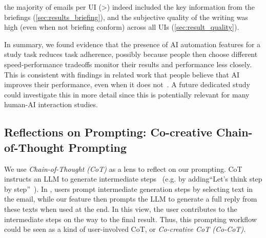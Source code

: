  the majority of emails per UI (>) indeed included the key information from the briefings (\cref{sec:results_briefing}), and the subjective quality of the writing was high (even when not briefing conform) across all UIs (\cref{sec:result_quality}).

In summary, we found evidence that the presence of AI automation features for a study task reduces task adherence, possibly because people then choose different speed-performance tradeoffs  monitor their results and performance less closely. This is consistent with findings in related work that people believe that AI improves their performance, even when it does not~\cite{Kloft2024placeborobust}.
A future dedicated study could investigate this in more detail since this is potentially relevant for many human-AI interaction studies. 






\subsection{Reflections on Prompting: Co-creative Chain-of-Thought Prompting}\label{sec:discussion_prompting}
We use \textit{Chain-of-Thought (CoT)} as a lens to reflect on our prompting.
CoT instructs an LLM to generate intermediate steps~\cite{wei2022chain} (e.g. by adding``Let's think step by step''~\cite{kojima2022large}). 
In \modeours{}, users prompt intermediate generation steps by selecting text in the email, while our \imppass{} feature then prompts the LLM to generate a full reply from these texts when used at the end. 
In this view, the user contributes to the intermediate steps on the way to the final result. Thus, this prompting workflow could be seen as a kind of user-involved CoT, or \textit{Co-creative CoT (Co-CoT).}

